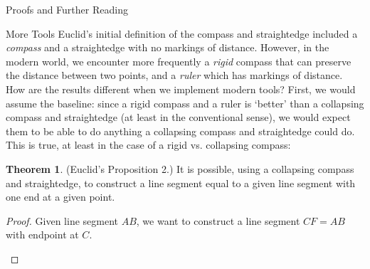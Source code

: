 \documentclass[12pt]{article}
\theoremstyle{definition}
\theoremstyle{definition}
\theoremstyle{definition}
\newtheorem{theorem}{Theorem}[section]
\theoremstyle{definition}
\theoremstyle{definition}
\theoremstyle{definition}
\theoremstyle{definition}
\begin{document}
\begin{section}{Proofs and Further Reading}
    \begin{subsection}{More Tools}
        Euclid's initial definition of the compass and straightedge included a \textit{compass} and a straightedge with no markings of distance. However, in the modern world, we encounter more frequently a \textit{rigid}
        compass that can preserve the distance between two points, and a \textit{ruler} which has markings of distance. How are the results different when we implement modern tools? First, we would 
        assume the baseline: since a rigid compass and a ruler is `better' than a collapsing compass and straightedge (at least in the conventional sense), we would expect them to be able to do anything a 
        collapsing compass and straightedge could do. This is true, at least in the case of a rigid vs. collapsing compass:
        \begin{theorem}{(Euclid's Proposition 2.)}
            It is possible, using a collapsing compass and straightedge, to construct a line segment equal to a given line segment with one end at a given point.
            \begin{proof}
                Given line segment \(AB\), we want to construct a line segment \(CF=AB\) with endpoint at \(C\).
                \begin{figure}[H]
                    \centering
\end{figure}
\end{proof}
\end{theorem}
\end{subsection}
\end{section}
\end{document}
